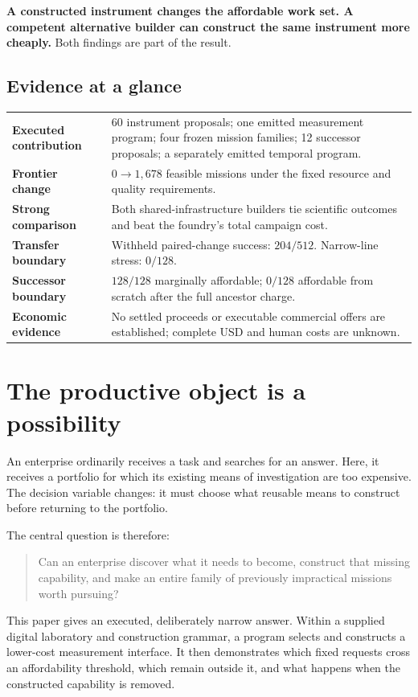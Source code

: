 \documentclass[11pt,a4paper]{article}
\begin{document}
\begin{claimbox}
\textbf{A constructed instrument changes the affordable work set. A competent alternative builder can construct the same instrument more cheaply.} Both findings are part of the result.
\end{claimbox}

\subsection*{Evidence at a glance}
\begin{tabularx}{\textwidth}{@{}>{\bfseries}p{}X@{}}
\toprule
Executed contribution & 60 instrument proposals; one emitted measurement program; four frozen mission families; 12 successor proposals; a separately emitted temporal program.\\
Frontier change & \(0\rightarrow1{,}678\) feasible missions under the fixed resource and quality requirements.\\
Strong comparison & Both shared-infrastructure builders tie scientific outcomes and beat the foundry's total campaign cost.\\
Transfer boundary & Withheld paired-change success: \(204/512\). Narrow-line stress: \(0/128\).\\
Successor boundary & \(128/128\) marginally affordable; \(0/128\) affordable from scratch after the full ancestor charge.\\
Economic evidence & No settled proceeds or executable commercial offers are established; complete USD and human costs are unknown.\\
\bottomrule
\end{tabularx}

\newpage
\section{The productive object is a possibility}

An enterprise ordinarily receives a task and searches for an answer. Here, it receives a portfolio for which its existing means of investigation are too expensive. The decision variable changes: it must choose what reusable means to construct before returning to the portfolio.

The central question is therefore:
\begin{quote}\large
Can an enterprise discover what it needs to become, construct that missing capability, and make an entire family of previously impractical missions worth pursuing?
\end{quote}
This paper gives an executed, deliberately narrow answer. Within a supplied digital laboratory and construction grammar, a program selects and constructs a lower-cost measurement interface. It then demonstrates which fixed requests cross an affordability threshold, which remain outside it, and what happens when the constructed capability is removed.
\end{document}
